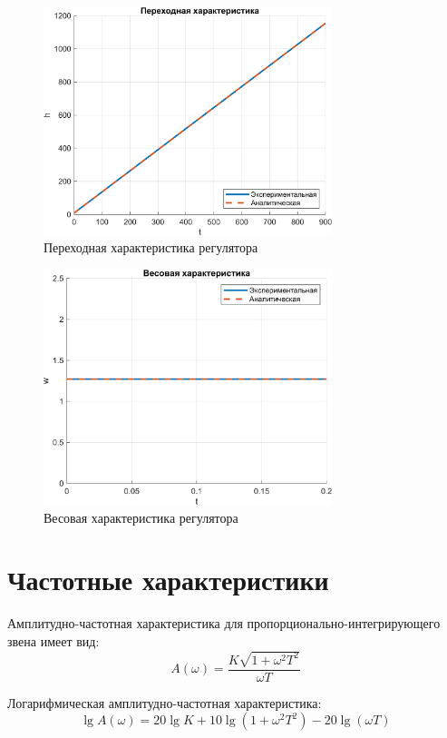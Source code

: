 \begin{figure}[H]
    \centering
    \includegraphics[width=0.75\textwidth, trim={0cm 0cm 0cm 0cm}]{../images/5_1.png}
    \caption{Переходная характеристика регулятора}
\end{figure}

\begin{figure}[H]
    \centering
    \includegraphics[width=0.75\textwidth, trim={0cm 0cm 0cm 0cm}]{../images/5_2.png}
    \caption{Весовая характеристика регулятора}
\end{figure}

\section{Частотные характеристики}

Амплитудно-частотная характеристика для пропорционально-интегрирующего звена имеет вид:
\[
    A(\omega) = \frac{K\sqrt{1 + \omega^2 T^2}}{\omega T}
\]

Логарифмическая амплитудно-частотная характеристика:
\[
    \lg A(\omega) = 20\lg K + 10\lg(1 + \omega^2 T^2) - 20\lg\left(\omega T\right)
\]

